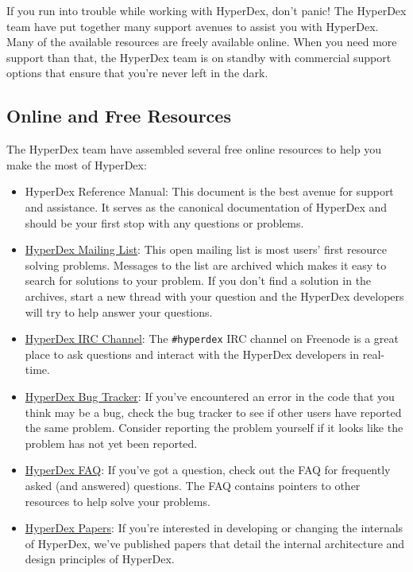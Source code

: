 If you run into trouble while working with HyperDex, don't panic!  The HyperDex
team have put together many support avenues to assist you with HyperDex.  Many
of the available resources are freely available online.  When you need more
support than that, the HyperDex team is on standby with commercial support
options that ensure that you're never left in the dark.

\subsection{Online and Free Resources}
\label{sec:introduction:support:free}

The HyperDex team have assembled several free online resources to help you make
the most of HyperDex:

\begin{itemize}
\item HyperDex Reference Manual:  This document is the best avenue for support
    and assistance.  It serves as the canonical documentation of HyperDex and
    should be your first stop with any questions or problems.
\item \href{https://groups.google.com/group/hyperdex-discuss}{HyperDex Mailing List}:
    This open mailing list is most users' first resource solving problems.
    Messages to the list are archived which makes it easy to search for
    solutions to your problem.  If you don't find a solution in the archives,
    start a new thread with your question and the HyperDex developers will try
    to help answer your questions.
\item \href{http://webchat.freenode.net/?channels=hyperdex\&uio=d4}{HyperDex IRC Channel}:
    The \texttt{\#hyperdex} IRC channel on Freenode is a great place to ask
    questions and interact with the HyperDex developers in real-time.
\item \href{https://github.com/rescrv/HyperDex/issues}{HyperDex Bug Tracker}:
    If you've encountered an error in the code that you think may be a bug,
    check the bug tracker to see if other users have reported the same problem.
    Consider reporting the problem yourself if it looks like the problem has not
    yet been reported.
\item \href{http://hyperdex.org/FAQ/}{HyperDex FAQ}:
    If you've got a question, check out the FAQ for frequently asked (and
    answered) questions.  The FAQ contains pointers to other resources to help
    solve your problems.
\item \href{http://hyperdex.org/papers/}{HyperDex Papers}:
    If you're interested in developing or changing the internals of HyperDex,
    we've published papers that detail the internal architecture and design
    principles of HyperDex.
\end{itemize}

